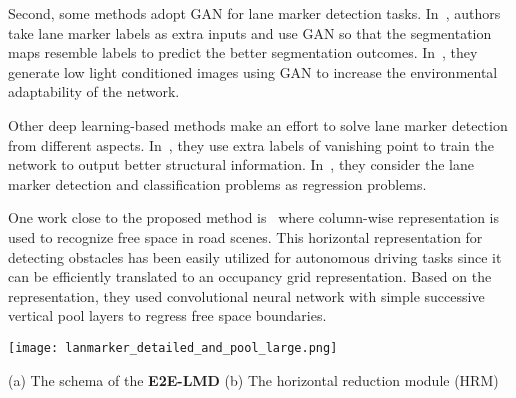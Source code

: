 \documentclass[10pt,twocolumn,letterpaper]{article}
\begin{document}
Second, some methods adopt GAN for lane marker detection tasks. In~\cite{ElGAN}, authors take lane marker labels as extra inputs and use GAN so that the segmentation maps resemble labels to predict the better segmentation outcomes. In~\cite{LaneGan}, they generate low light conditioned images using GAN to increase the environmental adaptability of the network. 

Other deep learning-based methods make an effort to solve lane marker detection from different aspects.  
In~\cite{VPG}, they use extra labels of vanishing point to train the network to output better structural information. In~\cite{MultiRegress}, they consider the lane marker detection and classification problems as regression problems.


One work close to the proposed method is~\cite{Drivable, StixelNet} where column-wise representation is used to recognize free space in road scenes. This horizontal representation for detecting obstacles has been easily utilized for autonomous driving tasks since it can be efficiently translated to an occupancy grid representation. Based on the representation, they used convolutional neural network with simple successive vertical pool layers to regress free space boundaries.  

\def\algorithmname{E2E-LMD}
\def\reductionname{HRM}
\def\reductionnames{HRMs}

\begin{figure*}[t]
	\begin{center}
		\texttt{[image: lanmarker\_detailed\_and\_pool\_large.png]}
	\end{center}
	\vspace{-10.pt}
	
	\footnotesize
	\makebox[0.3\textwidth][l]{} (a) The schema of the \textbf{\algorithmname}  \makebox[0.18\textwidth][l]{} (b) The horizontal reduction module (\reductionname)
	
	\vspace{5.pt}
	\caption{The \textbf{\algorithmname} architecture for lane marker detection. We extend general encoder-decoder architectures by adding successive horizontal reduction modules for end-to-end lane marker detection. Numbers under each block denote spatial resolution and channels. \textbf{(a)} Arrows with \reductionname\ denote a horizontal reduction module of (b). Arrows with \textit{Conv} are output convolution with $1\times1$. Dashed arrows denote the global average pooling with a fully connected layer. \textbf{(b)} \reductionname\ is utilized to compress the horizontal representation. $r$ denotes the pooling ratio for width part. Conv kernel size $k$ is set as 3 except the last \reductionname\ layer which set as 1.}
	\vspace{-3.pt}
	\label{fig:arch_deteails}
\end{figure*}
\end{document}
